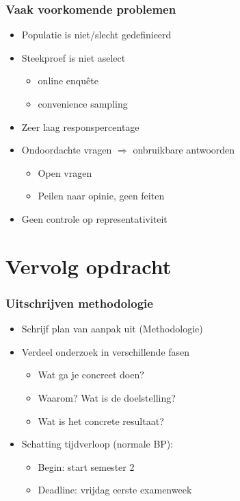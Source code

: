 \documentclass[aspectratio=169]{beamer}
\begin{document}
\begin{frame}
  \frametitle{Vaak voorkomende problemen}

  \begin{itemize}
    \item Populatie is niet/slecht gedefinieerd
    \item Steekproef is niet aselect
      \begin{itemize}
        \item online enquête
        \item convenience sampling
      \end{itemize}
    \item Zeer laag responspercentage
    \item Ondoordachte vragen $\Rightarrow$ onbruikbare antwoorden
      \begin{itemize}
        \item Open vragen
        \item Peilen naar opinie, geen feiten
      \end{itemize}
    \item Geen controle op representativiteit
  \end{itemize}

\end{frame}

\section{Vervolg opdracht}

\begin{frame}
  \frametitle{Uitschrijven methodologie}

  \begin{itemize}
    \item Schrijf plan van aanpak uit (Methodologie)
    \item Verdeel onderzoek in verschillende fasen
      \begin{itemize}
        \item Wat ga je concreet doen?
        \item Waarom? Wat is de doelstelling?
        \item Wat is het concrete resultaat?
      \end{itemize}
    \item Schatting tijdverloop (normale BP):
      \begin{itemize}
        \item Begin: start semester 2
        \item Deadline: vrijdag eerste examenweek
      \end{itemize}
  \end{itemize}

\end{frame}
\end{document}
